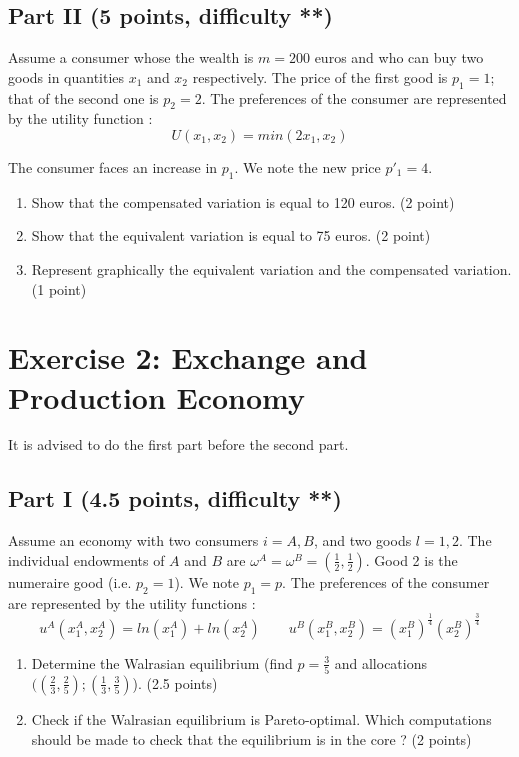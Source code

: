 \documentclass[11pt]{article} %
\begin{document}
\subsection*{Part II {\small (5 points, difficulty **)}}
Assume a consumer whose the wealth is $m = 200$ euros and who can buy two goods in quantities $x_1$ and $x_2$ respectively. The price of the first good is $p_1 = 1$; that of the second one is $p_2 = 2$. The preferences of the consumer are represented by the utility function :
\begin{equation*}
U (x_1, x_2) = min(2x_1, x_2) 
\end{equation*}

The consumer faces an increase in $p_1$. We note the new price $p'_1 = 4$.
\begin{enumerate}

\item Show that the compensated variation is equal to 120 euros. (2 point)
\item Show that the equivalent variation is equal to 75 euros. (2 point)
\item Represent graphically the equivalent variation and the compensated variation. (1 point)
\end{enumerate} 

\newpage
\section*{Exercise 2: Exchange and Production Economy }
It is advised to do the first part before the second part.\\

\subsection*{Part I {\small (4.5 points, difficulty **)}}
Assume an economy with two consumers $i = A, B$, and two goods $l = 1, 2$. The individual endowments of $A$ and $B$ are $\omega^A = \omega^B = (\frac{1}{2}, \frac{1}{2})$. Good 2 is the numeraire good (i.e. $p_2 = 1$). We note $p_1 = p$. The preferences of the consumer are represented by the utility functions :
\begin{equation*}
u^A(x_1^A, x_2^A) = ln(x_1^A) + ln(x_2^A) \quad  \quad
u^B(x_1^B, x_2^B) = (x_1^B)^{\frac{1}{4}}(x_2^B)^{\frac{3}{4}} 
\end{equation*}


\begin{enumerate}
\item Determine the Walrasian equilibrium (find $p = \frac{3}{5}$ and allocations $((\frac{2}{3},\frac{2}{5}) ; (\frac{1}{3},\frac{3}{5})$). (2.5 points)
\item Check if the Walrasian equilibrium is Pareto-optimal. Which computations should be made to check that the equilibrium is in the core ? (2 points)

\end{enumerate}
\end{document}
